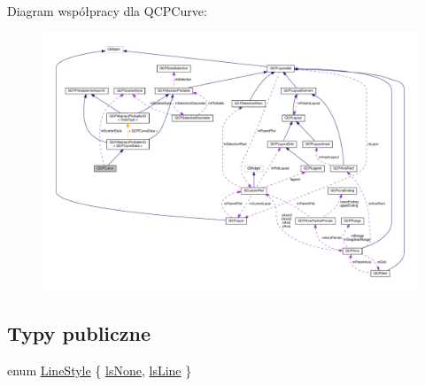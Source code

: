 Diagram współpracy dla Q\+C\+P\+Curve\+:\nopagebreak
\begin{figure}[H]
\begin{center}
\leavevmode
\includegraphics[width=350pt]{class_q_c_p_curve__coll__graph}
\end{center}
\end{figure}
\subsection*{Typy publiczne}
\begin{DoxyCompactItemize}
\item 
enum \hyperlink{class_q_c_p_curve_a2710e9f79302152cff794c6e16cc01f1}{Line\+Style} \{ \hyperlink{class_q_c_p_curve_a2710e9f79302152cff794c6e16cc01f1aec1601a191cdf0b4e761c4c66092cc48}{ls\+None}, 
\hyperlink{class_q_c_p_curve_a2710e9f79302152cff794c6e16cc01f1ade5822ce6fbf131d3df131795c2e1003}{ls\+Line}
 \}
\end{DoxyCompactItemize}
